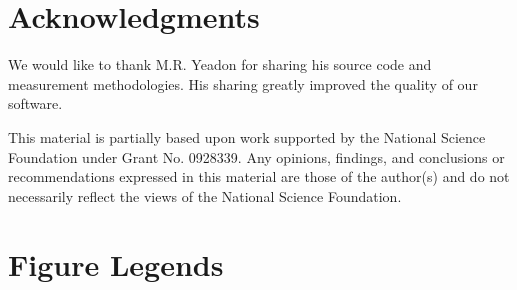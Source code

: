 \documentclass[10pt]{article}
\begin{document}
\section*{Acknowledgments}
We would like to thank M.R. Yeadon for sharing his source code and measurement
methodologies. His sharing greatly improved the quality of our software.

This material is partially based upon work supported by the National Science
Foundation under Grant No. 0928339. Any opinions, findings, and conclusions or
recommendations expressed in this material are those of the author(s) and do
not necessarily reflect the views of the National Science Foundation.



\section*{Figure Legends}
\end{document}
